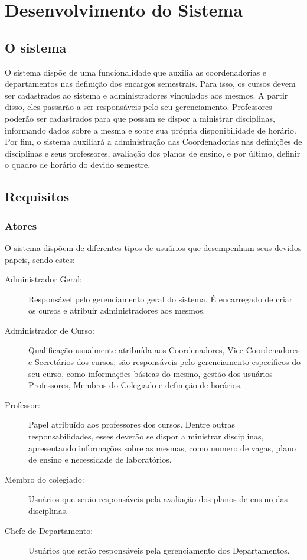 \chapter{Desenvolvimento do Sistema}\label{cap:dev_sist}

\section{O sistema}

O sistema dispõe de uma funcionalidade que auxilia as coordenadorias e departamentos nas definição dos encargos semestrais. Para isso, os cursos devem ser cadastrados ao sistema e administradores vinculados aos mesmos. A partir disso, eles passarão a ser responsáveis pelo seu gerenciamento. Professores poderão ser cadastrados para que possam se dispor a ministrar disciplinas, informando dados sobre a mesma e sobre sua própria disponibilidade de horário. Por fim, o sistema auxiliará a administração das Coordenadorias nas definições de disciplinas e seus professores, avaliação dos planos de ensino, e por último, definir o quadro de horário do devido semestre.

\section{Requisitos}\label{section:dev:req}

\subsection{Atores}
O sistema dispõem de diferentes tipos de usuários que desempenham seus devidos papeis, sendo estes:

    \begin{description}
        \item[Administrador Geral:] Responsável pelo gerenciamento geral do sistema. É encarregado de criar os cursos e atribuir administradores aos mesmos. 
        \item[Administrador de Curso:] Qualificação usualmente atribuída aos Coordenadores, Vice Coordenadores e Secretários dos cursos, são responsáveis pelo gerenciamento específicos do seu curso, como informações básicas do mesmo, gestão dos usuários Professores, Membros do Colegiado e definição de horários.
        \item[Professor:] Papel atribuído aos professores dos cursos. Dentre outras responsabilidades, esses deverão se dispor a ministrar disciplinas, apresentando informações sobre as mesmas, como numero de vagas, plano de ensino e necessidade de laboratórios.
        \item[Membro do colegiado:] Usuários que serão responsáveis pela avaliação dos planos de ensino das disciplinas.
        \item[Chefe de Departamento:] Usuários que serão responsáveis pela gerenciamento dos Departamentos.
    \end{description}

